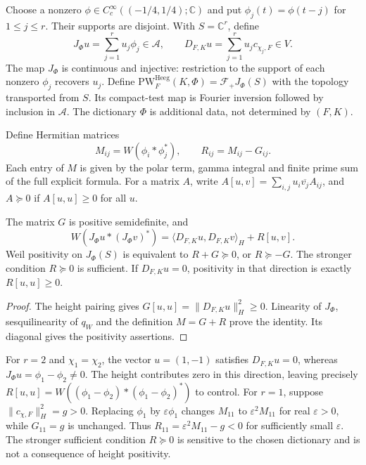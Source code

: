 Choose a nonzero $\phi\in C_c^\infty((-1/4,1/4);\mathbb C)$ and put
$\phi_j(t)=\phi(t-j)$ for $1\leq j\leq r$.
Their supports are disjoint. With $S=\mathbb C^r$, define
\[
 J_\Phi u=\sum_{j=1}^r u_j\phi_j\in\mathscr A,
 \qquad D_{F,K}u=\sum_{j=1}^r u_jc_{\chi_j,F}\in V.
\]
The map $J_\Phi$ is continuous and injective: restriction to the support
of each nonzero $\phi_j$ recovers $u_j$. Define
$\mathrm{PW}^{\mathrm{Heeg}}_F(K,\Phi)=\mathcal F_+J_\Phi(S)$
with the topology transported from $S$. Its compact-test map is Fourier
inversion followed by inclusion in $\mathscr A$.
The dictionary $\Phi$ is additional data, not determined by $(F,K)$.

Define Hermitian matrices
\[
 M_{ij}=W(\phi_i*\phi_j^*),\qquad R_{ij}=M_{ij}-G_{ij}.
\]
Each entry of $M$ is given by the polar term, gamma integral and finite
prime sum of the full explicit formula. For a matrix $A$, write
$A[u,v]=\sum_{i,j}u_i\overline{v_j}A_{ij}$, and $A\succeq0$ if
$A[u,u]\geq0$ for all $u$.

\begin{theorem}
\label{v4-arith:w8-atp:thm:Arakelov-Heegner}
The matrix $G$ is positive semidefinite, and
\begin{equation}
\label{v4-arith:w8-atp:eq:Heegner-formula}
 W(J_\Phi u*(J_\Phi v)^*)
 =\langle D_{F,K}u,D_{F,K}v\rangle_H+R[u,v].
\end{equation}
Weil positivity on $J_\Phi(S)$ is equivalent to $R+G\succeq0$,
or $R\succeq-G$. The stronger condition $R\succeq0$ is sufficient.
If $D_{F,K}u=0$, positivity in that direction is exactly $R[u,u]\geq0$.
\end{theorem}
\begin{proof}
The height pairing gives $G[u,u]=\|D_{F,K}u\|_H^2\geq0$.
Linearity of $J_\Phi$, sesquilinearity of $q_W$ and the definition
$M=G+R$ prove the identity. Its diagonal gives the positivity assertions.
\end{proof}

\begin{example}
For $r=2$ and $\chi_1=\chi_2$, the vector $u=(1,-1)$ satisfies
$D_{F,K}u=0$, whereas $J_\Phi u=\phi_1-\phi_2\ne0$.
The height contributes zero in this direction, leaving precisely
$R[u,u]=W((\phi_1-\phi_2)*(\phi_1-\phi_2)^*)$ to control.
For $r=1$, suppose $\|c_{\chi,F}\|_H^2=g>0$. Replacing $\phi_1$
by $\varepsilon\phi_1$ changes $M_{11}$ to
$\varepsilon^2M_{11}$ for real $\varepsilon>0$, while $G_{11}=g$
is unchanged. Thus $R_{11}=\varepsilon^2M_{11}-g<0$ for sufficiently
small $\varepsilon$. The stronger sufficient condition $R\succeq0$
is sensitive to the chosen dictionary and is not a consequence of
height positivity.
\end{example}

